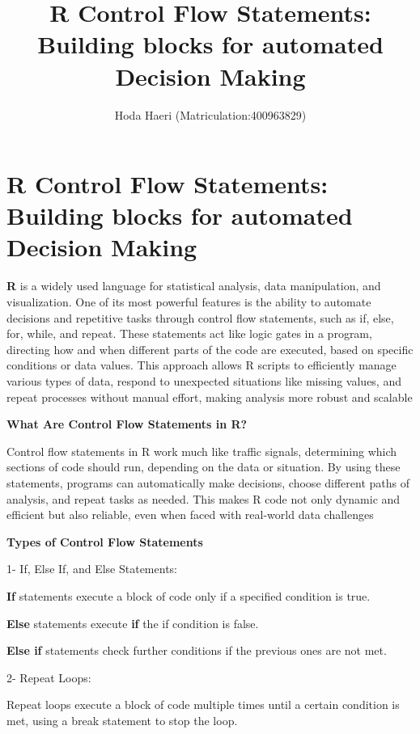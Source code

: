 \documentclass[
  man,
  floatsintext,
  longtable,
  nolmodern,
  notxfonts,
  notimes,
  colorlinks=true,linkcolor=blue,citecolor=blue,urlcolor=blue]{apa7}
\title{R Control Flow Statements: Building blocks for automated Decision
Making}
\author{Hoda Haeri (Matriculation:400963829)}
\affiliation{
{Hochschule Fresenius - University of Applied Science}}
\begin{document}
\maketitle

\hypertarget{toc}{}
\tableofcontents
\newpage
\section[Introduction]{R Control Flow Statements: Building blocks for
automated Decision Making}

\setcounter{secnumdepth}{-\maxdimen} %

\setlength\LTleft{0pt}


\textbf{R} is a widely used language for statistical analysis, data
manipulation, and visualization. One of its most powerful features is
the ability to automate decisions and repetitive tasks through control
flow statements, such as if, else, for, while, and repeat. These
statements act like logic gates in a program, directing how and when
different parts of the code are executed, based on specific conditions
or data values. This approach allows R scripts to efficiently manage
various types of data, respond to unexpected situations like missing
values, and repeat processes without manual effort, making analysis more
robust and scalable

\textbf{What Are Control Flow Statements in R?}

Control flow statements in R work much like traffic signals, determining
which sections of code should run, depending on the data or situation.
By using these statements, programs can automatically make decisions,
choose different paths of analysis, and repeat tasks as needed. This
makes R code not only dynamic and efficient but also reliable, even when
faced with real-world data challenges

\textbf{Types of Control Flow Statements}

1- If, Else If, and Else Statements:

\textbf{If} statements execute a block of code only if a specified
condition is true.

\textbf{Else} statements execute \textbf{if} the if condition is false.

\textbf{Else if} statements check further conditions if the previous
ones are not met.

2- Repeat Loops:

Repeat loops execute a block of code multiple times until a certain
condition is met, using a break statement to stop the loop.
\end{document}
